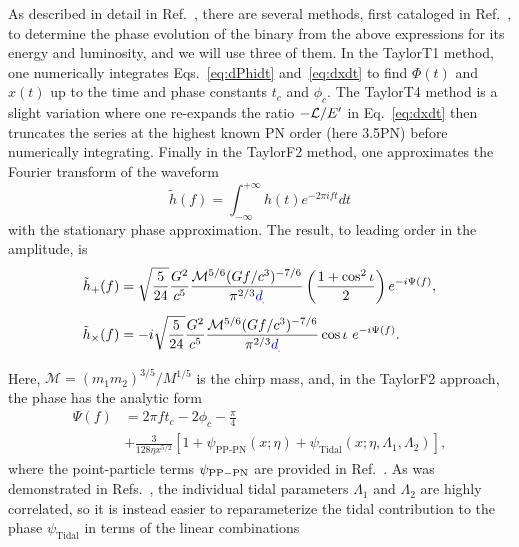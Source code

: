 \documentclass[twocolumn,prd,amssymb,aps,nofootinbib,showpacs,epsf]{revtex4}
\newcommand\les[2]{\textcolor{blue}{{#1}\sout{#2}}}
\begin{document}
As described in detail in Ref.~\cite{WadeCreightonOchsner2014}, there are several methods, first cataloged in Ref.~\cite{DamourIyerSathyaprakash2001}, to determine the phase evolution of the binary from the above expressions for its energy and luminosity, and we will use three of them.  In the TaylorT1 method, one numerically integrates Eqs.~\eqref{eq:dPhidt} and~\eqref{eq:dxdt} to find $\Phi(t)$ and $x(t)$ up to the time and phase constants $t_c$ and $\phi_c$. The TaylorT4 method is a slight variation where one re-expands the ratio $-{\cal L}/E^\prime$ in Eq.~\eqref{eq:dxdt} then truncates the series at the highest known PN order (here 3.5PN) before numerically integrating. Finally in the TaylorF2 method, one approximates the Fourier transform of the waveform
\begin{equation}
\tilde{h}(f)=\int_{-\infty}^{+\infty} h(t) e^{-2\pi i f t}dt
\end{equation}
with the stationary phase approximation. The result, to leading order in the amplitude, is
\begin{align}
\label{eq:hoffp}
\tilde{h}_+(f) &= \sqrt{\frac{5}{24}}\frac{G^2}{c^5}\frac{{\cal M}^{5/6}(Gf/c^3)^{-7/6}}{\pi^{2/3}\les{d}{}}\left(\frac{1+\cos^2\iota}{2}\right)e^{-i\Psi(f)},\\
\label{eq:hoffc}
\tilde{h}_\times(f) &= -i\sqrt{\frac{5}{24}}\frac{G^2}{c^5}\frac{{\cal M}^{5/6}(Gf/c^3)^{-7/6}}{\pi^{2/3}\les{d}{}}\cos\iota\mbox{ }e^{-i\Psi(f)}.
\end{align}
Here, $\mathcal{M} = (m_1 m_2)^{3/5}/M^{1/5}$ is the chirp mass, and, in the TaylorF2 approach, the phase has the analytic form 
\begin{equation}
\begin{split}
\Psi(f) &= 2\pi f t_c - 2\phi_c -\frac{\pi}{4}\\
& +\frac{3}{128\eta x^{5/2}}\left[1+\psi_\text{PP-PN}(x; \eta)+\psi_\text{Tidal}(x; \eta, \Lambda_1, \Lambda_2)\right],
\end{split}
\end{equation}
where the point-particle terms $\psi_{\rm PP-PN}$ are provided in Ref.~\cite{BuonannoIyerOchsner2009}. As was demonstrated in Refs.~\cite{FlanaganHinderer2008, Favata2014, WadeCreightonOchsner2014}, the individual tidal parameters $\Lambda_1$ and $\Lambda_2$ are highly correlated, so it is instead easier to reparameterize the tidal contribution to the phase $\psi_\text{Tidal}$ in terms of the linear combinations
\end{document}
